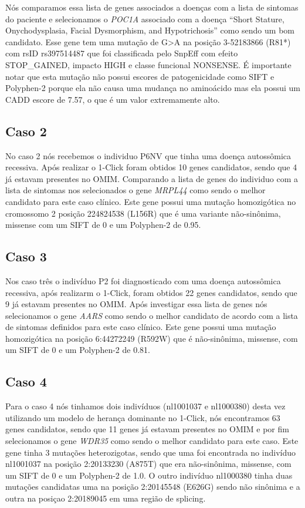 Nós comparamos essa lista de genes associados a doenças com a lista de sintomas do paciente e selecionamos o \textit{POC1A} associado com a doença ``Short Stature, Onychodysplasia, Facial Dysmorphism, and Hypotrichosis'' como sendo um bom candidato. Esse gene tem uma mutação de G>A na posição 3-52183866 (R81*) com rsID rs397514487 que foi classificada pelo SnpEff com efeito STOP\_GAINED, impacto HIGH e classe funcional NONSENSE. É importante notar que esta mutação não possui escores de patogenicidade como SIFT e Polyphen-2 porque ela não causa uma mudança no aminoácido mas ela possui um CADD escore de 7.57, o que é um valor extremamente alto.

\subsection{Caso 2}

No caso 2 nós recebemos o individuo P6NV que tinha uma doença autossômica recessiva. Após realizar o 1-Click foram obtidos 10 genes candidatos, sendo que 4 já estavam presentes no OMIM. Comparando a lista de genes do individuo com a lista de sintomas nos selecionados o gene \textit{MRPL44} como sendo o melhor candidato para este caso clínico. 
Este gene possui uma mutação homozigótica no cromossomo 2 posição 224824538 (L156R) que é uma variante não-sinônima, missense com um SIFT de 0 e um Polyphen-2 de 0.95.

\subsection{Caso 3}

Nos caso três o indivíduo P2 foi diagnosticado com uma doença autossômica recessiva, após realizarm o 1-Click, foram obtidos 22 genes candidatos, sendo que 9 já estavam presentes no OMIM. Após investigar essa lista de genes nós selecionamos o gene \textit{AARS} como sendo o melhor candidato de acordo com a lista de sintomas definidos para este caso clínico. Este gene possui uma mutação homozigótica na posição 6:44272249 (R592W) que é não-sinônima, missense, com um SIFT de 0 e um Polyphen-2 de 0.81.

\subsection{Caso 4}

Para o caso 4 nós tinhamos dois indivíduos (nl1001037 e nl1000380) desta vez utilizando um modelo de herança dominante no 1-Click, nós encontramos 63 genes candidatos, sendo que 11 genes já estavam presentes no OMIM e por fim selecionamos o gene \textit{WDR35} como sendo o melhor candidato para este caso. Este gene tinha 3 mutações heterozigotas, sendo que uma foi encontrada no indivíduo nl1001037 na posição 2:20133230 (A875T) que era não-sinônima, missense, com um SIFT de 0 e um Polyphen-2 de 1.0. O outro indivíduo nl1000380 tinha duas mutações candidatas uma na posição 2:20145548 (E626G) sendo não sinônima e a outra na posiçao 2:20189045 em uma região de splicing.

